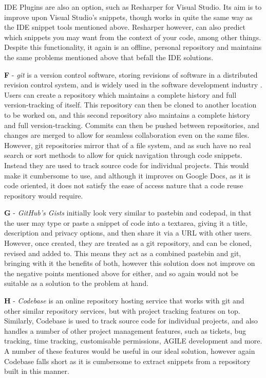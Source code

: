 IDE Plugins are also an option, such as Resharper for Visual Studio. Its aim is to improve upon Visual Studio's snippets, though works in quite the same way as the IDE snippet tools mentioned above. Resharper however, can also predict which snippets you may want from the context of your code, among other things. Despite this functionality, it again is an offline, personal repository and maintains the same problems mentioned above that befall the IDE solutions.

\textbf{F} - \textit{git} is a version control software, storing revisions of software in a distributed revision control system, and is widely used in the software development industry \cite{Skerrett2014}. Users can create a repository which maintains a complete history and full version-tracking of itself. This repository can then be cloned to another location to be worked on, and this second repository also maintains a complete history and full version-tracking. Commits can then be pushed between repositories, and changes are merged to allow for seamless collaboration even on the same files. However, git repositories mirror that of a file system, and as such have no real search or sort methods to allow for quick navigation through code snippets. Instead they are used to track source code for individual projects. This would make it cumbersome to use, and although it improves on Google Docs, as it is code oriented, it does not satisfy the ease of access nature that a code reuse repository would require.

\textbf{G} - \textit{GitHub's Gists} initially look very similar to pastebin and codepad, in that the user may type or paste a snippet of code into a textarea, giving it a title, description and privacy options, and then share it via a URL with other users. However, once created, they are treated as a git repository, and can be cloned, revised and added to. This means they act as a combined pastebin and git, bringing with it the benefits of both, however this solution does not improve on the negative points mentioned above for either, and so again would not be suitable as a solution to the problem at hand.

\textbf{H} - \textit{Codebase} is an online repository hosting service that works with git and other similar repository services, but with project tracking features on top. Similarly, Codebase is used to track source code for individual projects, and also handles a number of other project management features, such as tickets, bug tracking, time tracking, customisable permissions, AGILE development and more. A number of these features would be useful in our ideal solution, however again Codebase falls short as it is cumbersome to extract snippets from a repository built in this manner. 

